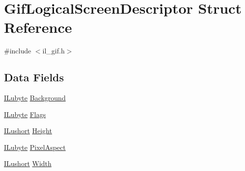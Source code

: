 \hypertarget{struct_gif_logical_screen_descriptor}{\section{Gif\-Logical\-Screen\-Descriptor Struct Reference}
\label{struct_gif_logical_screen_descriptor}
}


{\ttfamily \#include $<$il\-\_\-gif.\-h$>$}

\subsection*{Data Fields}
\begin{DoxyCompactItemize}
\item 
\hyperlink{il_8h_a8d2f04500100a86d1b00e98ab1b15a33}{I\-Lubyte} \hyperlink{struct_gif_logical_screen_descriptor_a9468a41e5676d6ca04aa9be57b5f0a3e}{Background}
\item 
\hyperlink{il_8h_a8d2f04500100a86d1b00e98ab1b15a33}{I\-Lubyte} \hyperlink{struct_gif_logical_screen_descriptor_a4d4e57f611ec63d5199ee6ea1c56077e}{Flags}
\item 
\hyperlink{il_8h_af6287b43748354a7c4864da43ae56962}{I\-Lushort} \hyperlink{struct_gif_logical_screen_descriptor_ab74e2bb7cc7272180be796817440ae4e}{Height}
\item 
\hyperlink{il_8h_a8d2f04500100a86d1b00e98ab1b15a33}{I\-Lubyte} \hyperlink{struct_gif_logical_screen_descriptor_a530e6f90c5ad1728974dc61cdbdb446a}{Pixel\-Aspect}
\item 
\hyperlink{il_8h_af6287b43748354a7c4864da43ae56962}{I\-Lushort} \hyperlink{struct_gif_logical_screen_descriptor_aed0f0a923b8346ba51a4de45fff77ee7}{Width}
\end{DoxyCompactItemize}


